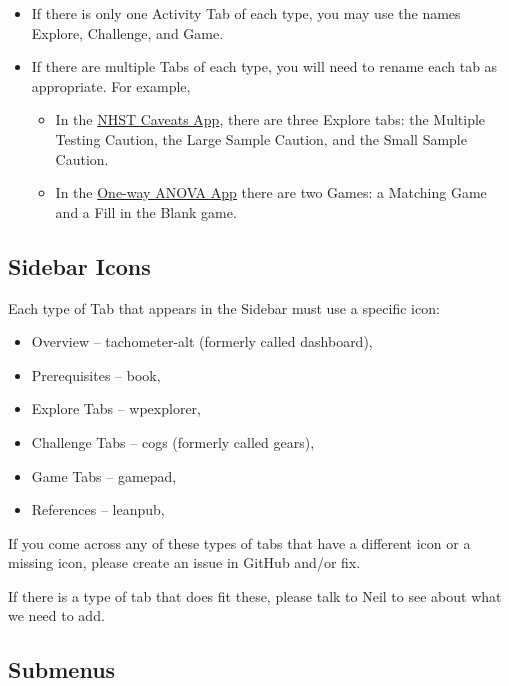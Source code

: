 \documentclass[
]{book}
\providecommand{\tightlist}{%
  \setlength{\itemsep}{0pt}\setlength{\parskip}{0pt}}
\begin{document}
\begin{itemize}
\tightlist
\item
  If there is only one Activity Tab of each type, you may use the names Explore, Challenge, and Game.
\item
  If there are multiple Tabs of each type, you will need to rename each tab as appropriate. For example,

  \begin{itemize}
  \tightlist
  \item
    In the \href{https://psu-eberly.shinyapps.io/Significance_Testing_Caveats/}{NHST Caveats App}, there are three Explore tabs: the Multiple Testing Caution, the Large Sample Caution, and the Small Sample Caution.
  \item
    In the \href{https://psu-eberly.shinyapps.io/OneWay_ANOVA/}{One-way ANOVA App} there are two Games: a Matching Game and a Fill in the Blank game.
  \end{itemize}
\end{itemize}

\hypertarget{sidebar-icons-1}{%
\subsection{Sidebar Icons}\label{sidebar-icons-1}}

Each type of Tab that appears in the Sidebar must use a specific icon:

\begin{itemize}
\tightlist
\item
  Overview -- tachometer-alt (formerly called dashboard), 
\item
  Prerequisites -- book, 
\item
  Explore Tabs -- wpexplorer, 
\item
  Challenge Tabs -- cogs (formerly called gears), \\
\item
  Game Tabs -- gamepad, 
\item
  References -- leanpub, 
\end{itemize}

If you come across any of these types of tabs that have a different icon or a missing icon, please create an issue in GitHub and/or fix.

If there is a type of tab that does fit these, please talk to Neil to see about what we need to add.

\hypertarget{submenus-1}{%
\subsection{Submenus}\label{submenus-1}}
\end{document}
